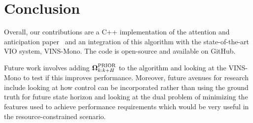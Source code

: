 
\section{Conclusion}\label{sec:conclusion}
Overall, our contributions are a C++ implementation of the attention and anticipation paper~\cite{Carlone2017} and an integration of this algorithm with the state-of-the-art VIO system, VINS-Mono.
The code is open-source and available on GitHub.

Future work involves adding ${\boldsymbol \Omega}_{k:k+H}^\text{PRIOR}$ to the algorithm and looking at the VINS-Mono to test if this improves performance.
Moreover, future avenues for research include looking at how control can be incorporated rather than using the ground truth for future state horizon and looking at the dual problem of minimizing the features used to achieve performance requirements which would be very useful in the resource-constrained scenario.